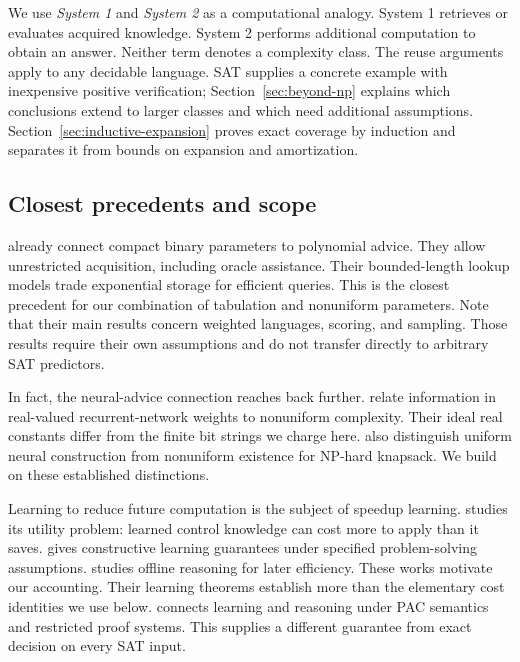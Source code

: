 \documentclass[11pt,a4paper]{article}
\numberwithin{equation}{section}
\theoremstyle{plain}
\theoremstyle{definition}
\theoremstyle{remark}
\begin{document}
We use \emph{System 1} and \emph{System 2} as a computational analogy. System 1 retrieves or evaluates acquired knowledge. System 2 performs additional computation to obtain an answer. Neither term denotes a complexity class. The reuse arguments apply to any decidable language. SAT supplies a concrete example with inexpensive positive verification; Section~\ref{sec:beyond-np} explains which conclusions extend to larger classes and which need additional assumptions. Section~\ref{sec:inductive-expansion} proves exact coverage by induction and separates it from bounds on expansion and amortization.

\subsection{Closest precedents and scope}

\citet{lin2021limitations} already connect compact binary parameters to polynomial advice. They allow unrestricted acquisition, including oracle assistance. Their bounded-length lookup models trade exponential storage for efficient queries. This is the closest precedent for our combination of tabulation and nonuniform parameters. Note that their main results concern weighted languages, scoring, and sampling. Those results require their own assumptions and do not transfer directly to arbitrary SAT predictors.

In fact, the neural-advice connection reaches back further. \citet{balcazar1997neural} relate information in real-valued recurrent-network weights to nonuniform complexity. Their ideal real constants differ from the finite bit strings we charge here. \citet{hertrich2023knapsack} also distinguish uniform neural construction from nonuniform existence for NP-hard knapsack. We build on these established distinctions.

Learning to reduce future computation is the subject of speedup learning. \citet{minton1988utility} studies its utility problem: learned control knowledge can cost more to apply than it saves. \citet{tadepalli1996speedup} gives constructive learning guarantees under specified problem-solving assumptions. \citet{moses1996knowledge} studies offline reasoning for later efficiency. These works motivate our accounting. Their learning theorems establish more than the elementary cost identities we use below. \citet{juba2013implicit} connects learning and reasoning under PAC semantics and restricted proof systems. This supplies a different guarantee from exact decision on every SAT input.
\end{document}
